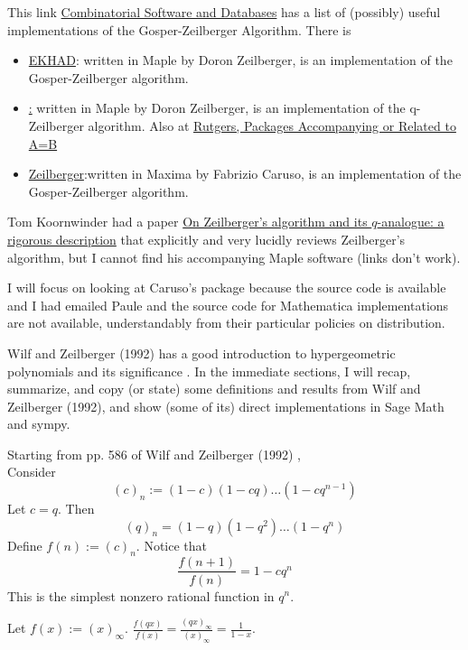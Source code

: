 \documentclass[10pt]{amsart}
\begin{document}
\begin{multicols*}{2}
This link \href{http://www.mat.univie.ac.at/~slc/divers/software.html}{Combinatorial Software and Databases} has a list of (possibly) useful implementations of the Gosper-Zeilberger Algorithm.  There is 
\begin{itemize}
\item \href{http://www.math.rutgers.edu/~zeilberg/tokhniot/EKHAD}{EKHAD}: written in Maple by Doron Zeilberger, is an implementation of the Gosper-Zeilberger algorithm.
\item \href{http://www.math.rutgers.edu/~zeilberg/tokhniot/qEKHAD}: written in Maple by Doron Zeilberger, is an implementation of the q-Zeilberger algorithm.  Also at \href{http://www.math.rutgers.edu/~zeilberg/programsAB.html}{Rutgers, Packages Accompanying or Related to A=B}
\item \href{http://www.risc.uni-linz.ac.at/research/combinat/risc/software/Zeilberger/}{Zeilberger}:written in Maxima by Fabrizio Caruso, is an implementation of the Gosper-Zeilberger algorithm.
\end{itemize}

Tom Koornwinder had a paper \href{https://staff.fnwi.uva.nl/t.h.koornwinder/art/1993/zeilbalgo.pdf}{On Zeilberger’s algorithm and its $q$-analogue: a rigorous description} that explicitly and very lucidly reviews Zeilberger's algorithm, but I cannot find his accompanying Maple software (links don't work).  

I will focus on looking at Caruso's package because the source code is available and I had emailed Paule and the source code for Mathematica implementations are not available, understandably from their particular policies on distribution.

Wilf and Zeilberger (1992) has a good introduction to hypergeometric polynomials and its significance \cite{HWilfDZeilberger1992}.  In the immediate sections, I will recap, summarize, and copy (or state) some definitions and results from  Wilf and Zeilberger (1992), and show (some of its) direct implementations in Sage Math and sympy.    

Starting from pp. 586 of Wilf and Zeilberger (1992) \cite{HWilfDZeilberger1992},  \\
Consider 
\[
(c)_n := (1-c)(1-cq) \dots (1-cq^{n-1})
\]
Let $c=q$.  Then
\[
(q)_n = (1-q)(1-q^2)\dots (1-q^n)
\]
Define $f(n):= (c)_n$.  Notice that 
\[
\frac{f(n+1)}{f(n)} = 1 - cq^n
\]
This is the simplest nonzero rational function in $q^n$.  

Let $f(x):=(x)_{\infty}$.  $\frac{f(qx)}{f(x)} = \frac{(qx)_{\infty} }{(x)_{\infty}} = \frac{1}{1-x}$.  


\end{multicols*}
\end{document}
